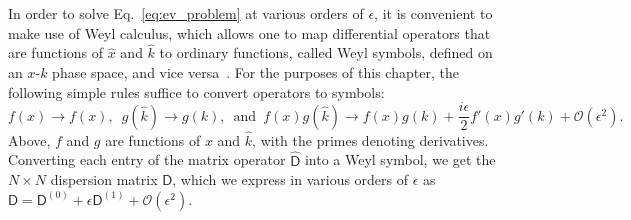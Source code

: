 In order to solve Eq.~\eqref{eq:ev_problem} at various orders of $\epsilon$, it is convenient to make use of Weyl calculus, which allows one to map differential operators that are functions of $\hat{x}$ and $\hat{k}$ to ordinary functions, called Weyl symbols, defined on an $x$-$k$ phase space, and vice versa~\cite{chaichian2001,cohen2012}.
For the purposes of this chapter, the following simple rules suffice to convert operators to symbols:
%
\begin{equation}
  f(x) \to f(x),\enspace
  g(\hat{k}) \to g(k),\enspace\text{and}\enspace
  f(x)g(\hat{k}) \to f(x)g(k) + \frac{i\epsilon}{2}f'(x)g'(k) + \mathcal{O}(\epsilon^{2}).
  \label{eq:weylrules}
\end{equation}
%
Above, $f$ and $g$ are functions of $x$ and $\hat{k}$, with the primes denoting derivatives.
Converting each entry of the matrix operator $\widehat{\mathsf{D}}$ into a Weyl symbol, we get the $N\times N$ dispersion matrix $\mathsf{D}$, which we express in various orders of $\epsilon$ as $\mathsf{D} = \mathsf{D}^{(0)} + \epsilon\mathsf{D}^{(1)} + \mathcal{O}(\epsilon^{2})$.

